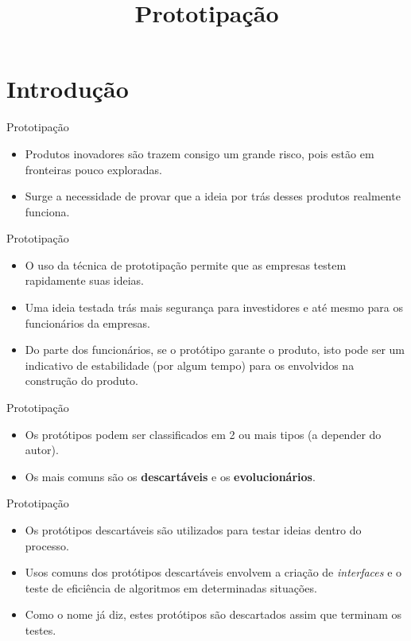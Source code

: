 \documentclass[11pt]{beamer}
\title{Prototipação}
\author{}
\date{}
\begin{document}
    \begin{frame}[plain]
        \titlepage
    \end{frame}

    \section{Introdução}

    \begin{frame}{Prototipação}
      \begin{itemize}
        \item Produtos inovadores são trazem consigo um grande risco, pois estão em fronteiras pouco exploradas.
        \item Surge a necessidade de provar que a ideia por trás desses produtos realmente funciona.
      \end{itemize}
    \end{frame}

    \begin{frame}{Prototipação}
      \begin{itemize}
        \item O uso da técnica de prototipação permite que as empresas testem rapidamente suas ideias.
        \item Uma ideia testada trás mais segurança para investidores e até mesmo para os funcionários da empresas.
        \item Do parte dos funcionários, se o protótipo garante o produto, isto pode ser um indicativo de estabilidade (por algum tempo) para os envolvidos na construção do produto. 
      \end{itemize}
    \end{frame}

    \begin{frame}{Prototipação}
      \begin{itemize}
        \item Os protótipos podem ser classificados em 2 ou mais tipos (a depender do autor).
        \item Os mais comuns são os \textbf{descartáveis} e os \textbf{evolucionários}.
      \end{itemize}
    \end{frame}

    \begin{frame}{Prototipação}
      \begin{itemize}
        \item Os protótipos descartáveis são utilizados para testar ideias dentro do processo.
        \item Usos comuns dos protótipos descartáveis envolvem a criação de \textit{interfaces} e o teste de eficiência de algoritmos em determinadas situações.
        \item Como o nome já diz, estes protótipos são descartados assim que terminam os testes.  
      \end{itemize}
    \end{frame}
\end{document}

